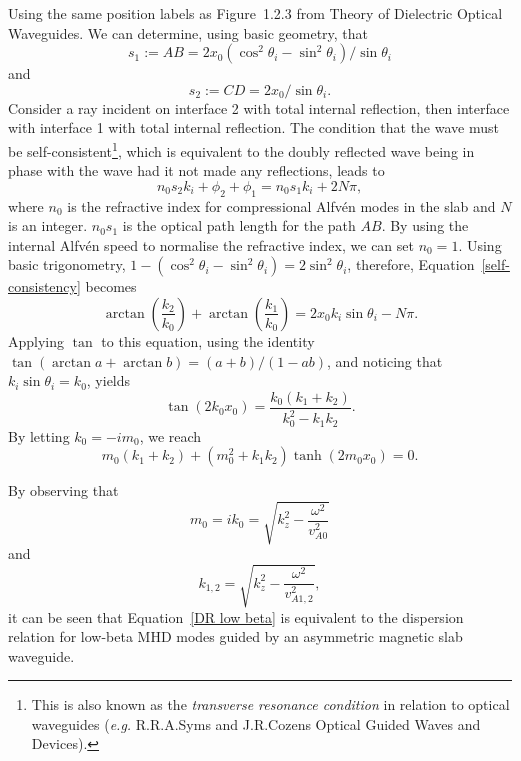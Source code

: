 \documentclass[12pt]{article}
\begin{document}
	Using the same position labels as Figure~1.2.3 from \cite{mar74} {Theory of Dielectric Optical Waveguides}. We can determine, using basic geometry, that
	\begin{equation}
	s_1 := AB = 2x_0(\cos^2{\theta_i} - \sin^2{\theta_i})/\sin{\theta_i}
	\end{equation}
	and
	\begin{equation}
	s_2 := CD = 2x_0/\sin{\theta_i}.
	\end{equation}
	Consider a ray incident on interface 2 with total internal reflection, then interface with interface 1 with total internal reflection. The condition that the wave must be self-consistent\footnote{This is also known as the \textit{transverse resonance condition} in relation to optical waveguides (\textit{e.g.} R.R.A.Syms and J.R.Cozens Optical Guided Waves and Devices).}, which is equivalent to the doubly reflected wave being in phase with the wave had it not made any reflections, leads to
	\begin{equation}
	n_0 s_2 k_i  + \phi_2 + \phi_1 = n_0 s_1 k_i + 2N\pi, \label{self-consistency}
	\end{equation}
	where $n_0$ is the refractive index for compressional Alfv\'{e}n modes in the slab and $N$ is an integer. $n_0s_1$ is the optical path length for the path $AB$. By using the internal Alfv\'{e}n speed to normalise the refractive index, we can set $n_0 = 1$. Using basic trigonometry, $1 - (\cos^2{\theta_i} - \sin^2{\theta_i}) = 2\sin^2{\theta_i}$, therefore, Equation~\eqref{self-consistency} becomes
	\begin{equation}
	\arctan\left(\frac{k_2}{k_0}\right) + \arctan\left(\frac{k_1}{k_0}\right) = 2x_0k_i \sin{\theta_i} - N\pi.
	\end{equation}
	Applying $\tan$ to this equation, using the identity $\tan(\arctan{a} + \arctan{b}) = (a + b) / (1 - ab)$, and noticing that $k_i\sin{\theta_i} = k_0$, yields
	\begin{equation}
	\tan(2k_0x_0) = \frac{k_0 (k_1 + k_2)}{k_0^2 - k_1k_2}.
	\end{equation}
	By letting $k_0 = -im_0$, we reach
	\begin{equation}
	m_0 (k_1 + k_2) + (m_0^2 + k_1k_2)\tanh(2m_0x_0) = 0. \label{DR low beta}
	\end{equation}
	
	By observing that
	\begin{equation}
	m_0 = ik_0 = \sqrt{k_z^2 - \frac{\omega^2}{v_{A0}^2}}
	\end{equation}
	and
	\begin{equation}
	k_{1,2} = \sqrt{k_z^2 - \frac{\omega^2}{v_{A1,2}^2}},
	\end{equation}
	it can be seen that Equation~\eqref{DR low beta} is equivalent to the dispersion relation for low-beta MHD modes guided by an asymmetric magnetic slab waveguide.
	
\end{document}
